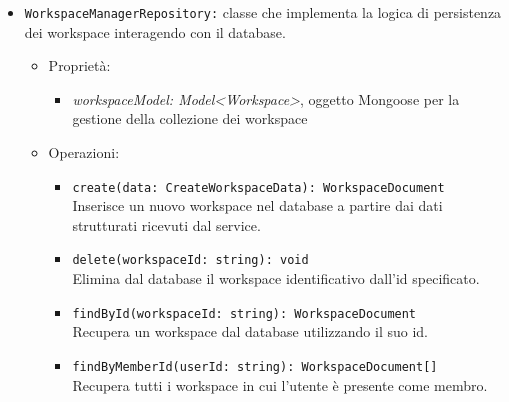 \documentclass[a4paper, 11pt]{article}
\begin{document}
\begin{itemize}
\begin{itemize}
\begin{itemize}
\begin{itemize}
              \item \texttt{deleteWorkspace(workspaceId: string, requesterId: string): void} \\
              Elimina un workspace dopo aver verificato che l'utente richiedente sia l'owner del workspace.
              
              \item \texttt{getWorkspaces(userId: string): WorkspaceListItemBo[]} \\
              Recupera tutti i workspace in cui l'utente è membro e restituisce per ciascuno le informazioni essenziali (id, nome, owner username e ruolo dell'utente).
          \end{itemize}
        \end{itemize}
        
        
        \item \texttt{WorkspaceManagerRepository:} classe che implementa la logica di persistenza dei workspace interagendo con il database.
        \begin{itemize}
					\item Proprietà:
						\begin{itemize}
							\item \textit{workspaceModel: Model<Workspace>}, oggetto Mongoose per la gestione della collezione dei workspace
						\end{itemize}
					\item Operazioni:
        
          \begin{itemize}
              \item \texttt{create(data: CreateWorkspaceData): WorkspaceDocument} \\
              Inserisce un nuovo workspace nel database a partire dai dati strutturati ricevuti dal service.
              
              \item \texttt{delete(workspaceId: string): void} \\
              Elimina dal database il workspace identificativo dall'id specificato.
              
              \item \texttt{findById(workspaceId: string): WorkspaceDocument} \\
              Recupera un workspace dal database utilizzando il suo id.
              
              \item \texttt{findByMemberId(userId: string): WorkspaceDocument[]} \\
              Recupera tutti i workspace in cui l'utente è presente come membro.
          \end{itemize}
        \end{itemize}
        

\end{itemize}
\end{itemize}
\end{document}

